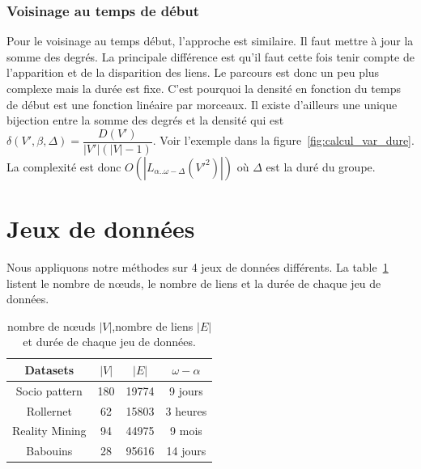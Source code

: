 \subsubsection{Voisinage au temps de début}
Pour le voisinage au temps début, l'approche est similaire.
Il faut mettre à jour la somme des degrés.
La principale différence est qu'il faut cette fois tenir compte de l'apparition et de la disparition des liens.
Le parcours est donc un peu plus complexe mais la durée est fixe.
C'est pourquoi la densité en fonction du temps de début est une fonction linéaire par morceaux.
Il existe d'ailleurs une unique bijection entre la somme des degrés et la densité qui est $\delta(V',\beta, \Delta)= \dfrac{D(V')}{|V'|(|V|-1)}$.
Voir l'exemple dans la figure~\ref{fig:calcul_var_dure}.
La complexité est donc $O(|L_{\alpha..\omega-\Delta}(V'^2)|)$ où $\Delta$ est la duré du groupe.


\section{Jeux de données}
\label{sec:groupe_dense_data}
Nous appliquons notre méthodes sur 4 jeux de données différents.
La table~\ref{tab:data_spec_groupe_dense} listent le nombre de n\oe uds, le nombre de liens et la durée de chaque jeu de données.

\begin{table}
\centering

\begin{tabular}{|c|c|c|c|}
\hline  \rule[-1ex]{0pt}{3.5ex}
Datasets & $|V|$ & $|E|$ & $\omega - \alpha$  \\
\hline
Socio pattern & 180 & 19774 & 9 jours \\
Rollernet & 62 & 15803 &  3 heures\\
Reality Mining & 94 & 44975 & 9 mois\\
Babouins & 28 & 95616 & 14 jours\\
\hline
\end{tabular}
\caption{nombre de n\oe uds $|V|$,nombre de liens $|E|$ et durée de chaque jeu de données.}
\label{tab:data_spec_groupe_dense} 
\end{table}

